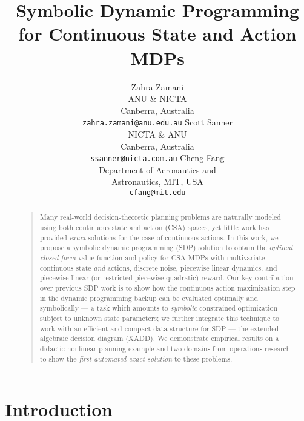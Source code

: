 \documentclass[letterpaper]{article}
\begin{document}
%
\title{Symbolic Dynamic Programming for Continuous State and Action MDPs}
\author{Zahra Zamani\\
ANU \& NICTA\\
Canberra, Australia\\
{\tt zahra.zamani@anu.edu.au}
\And
Scott Sanner\\
NICTA \& ANU\\
Canberra, Australia\\
{\tt ssanner@nicta.com.au}
\And
Cheng Fang\\
Department of Aeronautics and\\
Astronautics, MIT, USA\\
{\tt cfang@mit.edu}
}
\maketitle
\begin{abstract}
\begin{quote}
Many real-world decision-theoretic planning problems are naturally
modeled using both continuous state and action (CSA) spaces, yet
little work has provided \emph{exact} solutions for the case of
continuous actions.  In this work, we propose a symbolic dynamic
programming (SDP) solution to obtain the \emph{optimal closed-form}
value function and policy for CSA-MDPs with multivariate continuous
state \emph{and} actions, discrete noise, piecewise linear dynamics,
and piecewise linear (or restricted piecewise quadratic) reward.  Our
key contribution over previous SDP work is to show how the continuous
action maximization step in the dynamic programming backup can be
evaluated optimally and symbolically --- a task which amounts to
\emph{symbolic} constrained optimization subject to unknown state
parameters; we further integrate this technique to work with an
efficient and compact data structure for SDP --- the extended
algebraic decision diagram (XADD).  We demonstrate empirical results
on a didactic nonlinear planning example and two domains from operations
research to show the \emph{first automated exact solution} to these
problems.
\end{quote}
\end{abstract}

\section{Introduction}
\end{document}
